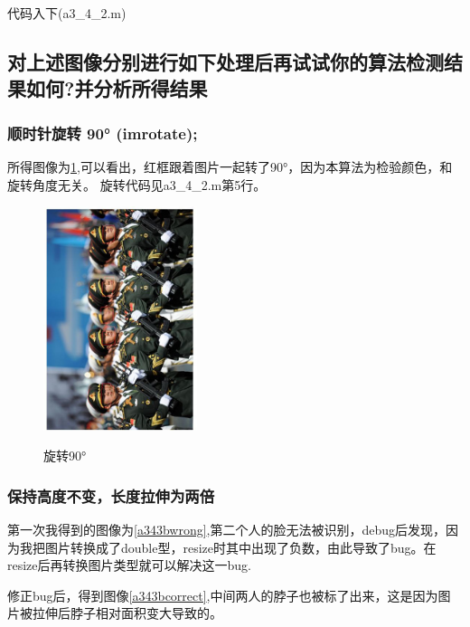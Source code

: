 \documentclass{ctexart}
\begin{document}
代码入下(a3\_4\_2.m)


\subsection{对上述图像分别进行如下处理后再试试你的算法检测结果如何?并分析所得结果}
\subsubsection{顺时针旋转 90° (imrotate);}

所得图像为\ref{a343a},可以看出，红框跟着图片一起转了90°，因为本算法为检验颜色，和旋转角度无关。
旋转代码见a3\_4\_2.m第5行。
\begin{figure}
    \centering
    \includegraphics[width=0.4\textwidth]{pic/ex2_rotate.jpg}\\
    \caption{旋转90°\label{a343a}}
\end{figure}
\subsubsection{保持高度不变，长度拉伸为两倍}
第一次我得到的图像为\ref{a343bwrong},第二个人的脸无法被识别，debug后发现，因为我把图片转换成了double型，resize时其中出现了负数，由此导致了bug。在resize后再转换图片类型就可以解决这一bug.

修正bug后，得到图像\ref{a343bcorrect},中间两人的脖子也被标了出来，这是因为图片被拉伸后脖子相对面积变大导致的。
\end{document}
